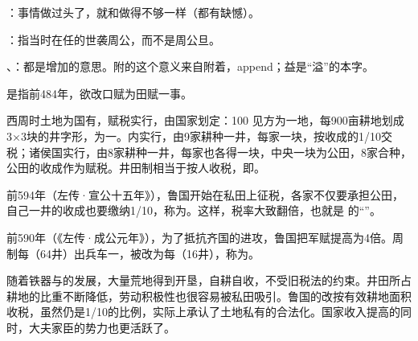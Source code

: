 {
\item {}：事情做过头了，就和做得不够一样（都有缺憾）。
}
{}  %


{
\item {}：指当时在任的世袭周公，而不是周公旦。
\item {}、：都是增加的意思。附的这个意义来自附着，append；益是“溢”的本字。

是指前484年，欲改口赋为田赋一事。
\begin{lyitemize}
\item {}西周时土地为国有，赋税实行，由国家划定：100 见方为一地，每900亩耕地划成3×3块的井字形，为一。内实行，由9家耕种一井，每家一块，按收成的1/10交税；诸侯国实行，由8家耕种一井，每家也各得一块，中央一块为公田，8家合种，公田的收成作为赋税。井田制相当于按人收税，即。

\item {}前594年（左传·宣公十五年》），鲁国开始在私田上征税，各家不仅要承担公田，自己一井的收成也要缴纳1/10，称为。这样，税率大致翻倍，也就是  的“”。

\item {}前590年（《左传·成公元年》），为了抵抗齐国的进攻，鲁国把军赋提高为4倍。周制每（64井）出兵车一，被改为每（16井），称为。

\item {}随着铁器与的发展，大量荒地得到开垦，自耕自收，不受旧税法的约束。井田所占耕地的比重不断降低，劳动积极性也很容易被私田吸引。鲁国的改按有效耕地面积收税，虽然仍是1/10的比例，实际上承认了土地私有的合法化。国家收入提高的同时，大夫家臣的势力也更活跃了。
\end{lyitemize}

}
